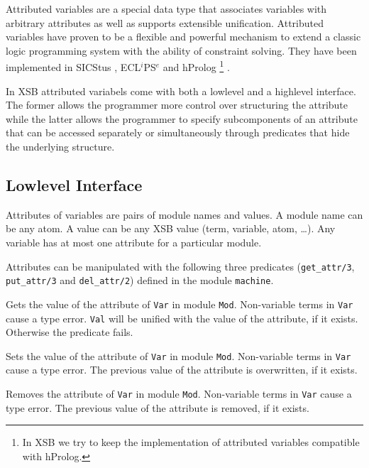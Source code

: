 Attributed variables are a special data type that associates variables
with arbitrary attributes as well as supports extensible unification.
Attributed variables have proven to be a flexible and powerful mechanism
to extend a classic logic programming system with the ability of
constraint solving.  They have been implemented in SICStus \cite{sicstus-manual}, 
ECL$^i$PS$^e$ \cite{eclipse-manual} and hProlog \footnote{In XSB we try
to keep the implementation of attributed variables compatible with hProlog.} \cite{hprolog}.

In XSB attributed variabels come with both a lowlevel and a highlevel
interface.  The former allows the programmer more control over structuring
the attribute while the latter allows the programmer to specify subcomponents
of an attribute that can be accessed separately or simultaneously through
predicates that hide the underlying structure.

\subsection{Lowlevel Interface}

Attributes of variables are pairs of module names and values. A module name can be any atom.
A value can be any XSB value (term, variable, atom, \ldots). Any variable has at most one 
attribute for a particular module.

Attributes can be manipulated with the following three predicates (\texttt{get\_attr/3},
\texttt{put\_attr/3} and \texttt{del\_attr/2}) defined in the module \texttt{machine}.

\begin{description}
   Gets the value of the attribute of \texttt{Var} in module \texttt{Mod}. Non-variable
   terms in \texttt{Var} cause a type error. \texttt{Val} will be unified with the
   value of the attribute, if it exists. Otherwise the predicate fails.

   Sets the value of the attribute of \texttt{Var} in module \texttt{Mod}. Non-variable
   terms in \texttt{Var} cause a type error. The previous value of the attribute is
   overwritten, if it exists.

   Removes the attribute of \texttt{Var} in module \texttt{Mod}. Non-variable
   terms in \texttt{Var} cause a type error. The previous value of the attribute
   is removed, if it exists. 
\end{description}

